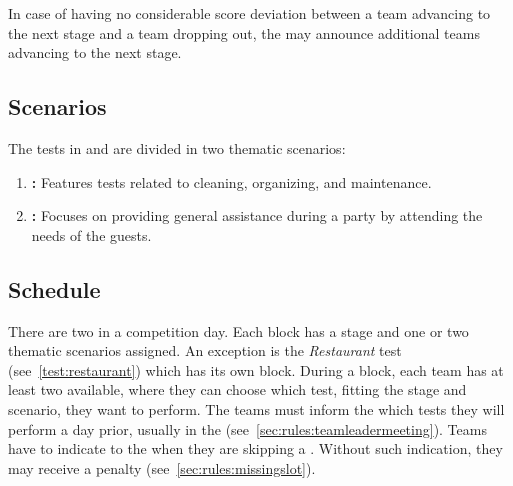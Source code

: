 \noindent In case of having no considerable score deviation between a team advancing to the next stage and a team dropping out, the \TC{} may announce additional teams advancing to the next stage.

\subsection{Scenarios}
\label{sec:rules:scenarios}
The tests in \SONE{} and \STWO{} are divided in two thematic scenarios:
\begin{enumerate}
	\item \textbf{\Housekeeper{}:} Features tests related to cleaning, organizing, and maintenance.
	
	\item \textbf{\Partyhost{}:} Focuses on providing general assistance during a party by attending the needs of the guests.
\end{enumerate}


\subsection{Schedule}
\label{sec:rules:schedule}
There are two \Testblocks{} in a competition day. Each block has a stage and one or two thematic scenarios assigned. An exception is the \emph{Restaurant} test (see~\ref{test:restaurant}) which has its own block. During a block, each team has at least two \Testslots{} available, where they can choose which test, fitting the stage and scenario, they want to perform. The teams must inform the \OC{} which tests they will perform a day prior, usually in the \TLM{} (see~\ref{sec:rules:teamleadermeeting}). Teams have to indicate to the  when they are skipping a \Testslot{}. Without such indication, they may receive a penalty (see~\ref{sec:rules:missingslot}).

